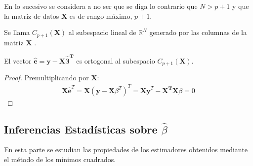 \noindent En lo sucesivo se considera a no ser que se diga lo contrario que $N>p+1$ y que la matriz de datos $\mathbf{X}$ es de rango máximo, $p+1$. 

\begin{defi}
Se llama  $C_{p+1}(\mathbf{X})$ al subespacio lineal de $\mathbb{R}^{N}$ generado por las columnas de la matriz $\mathbf{X}$ \cite{Cuadras 2014}.
\end{defi}
\begin{propo}
El vector $\hat{\mathbf{e}}=\mathbf{y}-\mathbf{X\hat{\beta}^T}$ es ortogonal al subespacio $C_{p+1}(\mathbf{X})$.
\begin{proof}
Premultiplicando por $\mathbf{X}$:
\begin{equation}
\begin{split}
\mathbf{X\hat{\mathbf{e}}}^T=\mathbf{X}(\mathbf{y-X}\beta^T)^T=\mathbf{Xy}^T-\mathbf{X^T X}\beta=0
\end{split}
\end{equation}
\end{proof}
\end{propo}


\subsection{Inferencias Estadísticas sobre $\hat{\beta}$}

\noindent En esta parte se estudian las propiedades de los estimadores obtenidos mediante el método de los mínimos cuadrados. 

